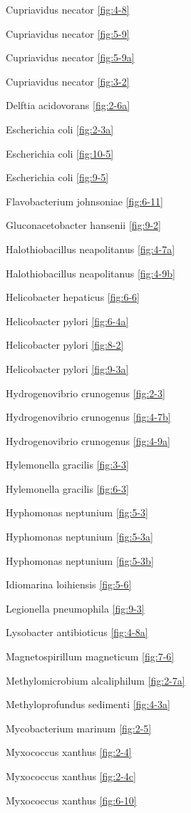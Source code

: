 \documentclass[]{tufte-book}
\begin{document}
Cupriavidus necator \ref{fig:4-8}

Cupriavidus necator \ref{fig:5-9}

Cupriavidus necator \ref{fig:5-9a}

Cupriavidus necator \ref{fig:3-2}

Delftia acidovorans \ref{fig:2-6a}

Escherichia coli \ref{fig:2-3a}

Escherichia coli \ref{fig:10-5}

Escherichia coli \ref{fig:9-5}

Flavobacterium johnsoniae \ref{fig:6-11}

Gluconacetobacter hansenii \ref{fig:9-2}

Halothiobacillus neapolitanus \ref{fig:4-7a}

Halothiobacillus neapolitanus \ref{fig:4-9b}

Helicobacter hepaticus \ref{fig:6-6}

Helicobacter pylori \ref{fig:6-4a}

Helicobacter pylori \ref{fig:8-2}

Helicobacter pylori \ref{fig:9-3a}

Hydrogenovibrio crunogenus \ref{fig:2-3}

Hydrogenovibrio crunogenus \ref{fig:4-7b}

Hydrogenovibrio crunogenus \ref{fig:4-9a}

Hylemonella gracilis \ref{fig:3-3}

Hylemonella gracilis \ref{fig:6-3}

Hyphomonas neptunium \ref{fig:5-3}

Hyphomonas neptunium \ref{fig:5-3a}

Hyphomonas neptunium \ref{fig:5-3b}

Idiomarina loihiensis \ref{fig:5-6}

Legionella pneumophila \ref{fig:9-3}

Lysobacter antibioticus \ref{fig:4-8a}

Magnetospirillum magneticum \ref{fig:7-6}

Methylomicrobium alcaliphilum \ref{fig:2-7a}

Methyloprofundus sedimenti \ref{fig:4-3a}

Mycobacterium marinum \ref{fig:2-5}

Myxococcus xanthus \ref{fig:2-4}

Myxococcus xanthus \ref{fig:2-4c}

Myxococcus xanthus \ref{fig:6-10}
\end{document}
